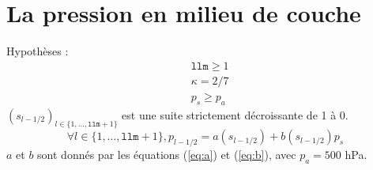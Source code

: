 \documentclass[a4paper,french]{article}
\begin{document}
\section{La pression en milieu de couche}

Hypothèses :
{\color{green}
\begin{align*}
  & \mathtt{llm} \ge 1 \\
  & \kappa = 2 / 7 \\
  & p_s \ge p_a
\end{align*}
$(s_{l - 1 / 2})_{l \in \{1, \dots, \mathtt{llm} + 1\}}$ est une suite
strictement décroissante de 1 à 0.
\begin{equation*}
  \forall l \in \{1, \dots, \mathtt{llm} + 1\},
  p_{l - 1 / 2} = a(s_{l - 1 / 2}) + b(s_{l - 1 / 2}) p_s
\end{equation*}
$a$ et $b$ sont donnés par les équations (\ref{eq:a}) et (\ref{eq:b}),
avec $p_a = 500$ hPa.}
\end{document}
